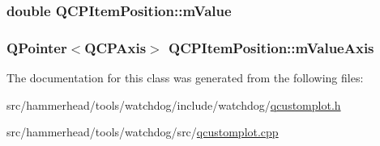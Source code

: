 \subsubsection[{\texorpdfstring{m\+Value}{mValue}}]{\setlength{\rightskip}{0pt plus 5cm}double Q\+C\+P\+Item\+Position\+::m\+Value\hspace{0.3cm}{\ttfamily [protected]}}\hypertarget{classQCPItemPosition_a67bf5df69f587d53731724a7d61c6c3f}{}\label{classQCPItemPosition_a67bf5df69f587d53731724a7d61c6c3f}
\subsubsection[{\texorpdfstring{m\+Value\+Axis}{mValueAxis}}]{\setlength{\rightskip}{0pt plus 5cm}Q\+Pointer$<${\bf Q\+C\+P\+Axis}$>$ Q\+C\+P\+Item\+Position\+::m\+Value\+Axis\hspace{0.3cm}{\ttfamily [protected]}}\hypertarget{classQCPItemPosition_a505dc2da24ba274452c1c817fcaba011}{}\label{classQCPItemPosition_a505dc2da24ba274452c1c817fcaba011}


The documentation for this class was generated from the following files\+:\begin{DoxyCompactItemize}
\item 
src/hammerhead/tools/watchdog/include/watchdog/\hyperlink{qcustomplot_8h}{qcustomplot.\+h}\item 
src/hammerhead/tools/watchdog/src/\hyperlink{qcustomplot_8cpp}{qcustomplot.\+cpp}\end{DoxyCompactItemize}
